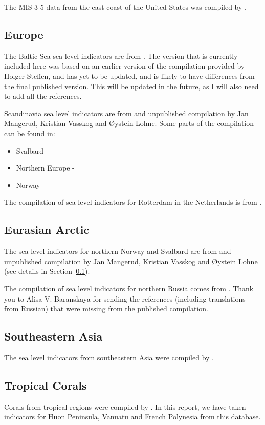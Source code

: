 The MIS 3-5 data from the east coast of the United States was compiled by \citet{PicoEtal2017}.

\subsection{Europe}

\label{sec:Europe}

The Baltic Sea sea level indicators are from \citep{RosentauEtal2021}. The version that is currently included here was based on an earlier version of the compilation provided by Holger Steffen, and has yet to be updated, and is likely to have differences from the final published version. This will be updated in the future, as I will also need to add all the references.


Scandinavia sea level indicators are from and unpublished compilation by Jan Mangerud, Kristian Vasskog and \O{}ystein Lohne. Some parts of the compilation can be found in:

\begin{itemize}
  \item Svalbard - \citet{BondevikEtal1995}
  \item Northern Europe - \citet{FormanEtal2004}
  \item Norway - \citet{LohneEtal2007,RomundsetEtal2010,RomundsetEtal2011,RomundsetEtal2015,RomundsetEtal2018,VasskogEtal2019}
\end{itemize}

The compilation of sea level indicators for Rotterdam in the Netherlands is from \citet{HijmaCohen2019}.


\subsection{Eurasian Arctic}

The sea level indicators for northern Norway and Svalbard are from and unpublished compilation by Jan Mangerud, Kristian Vasskog and \O{}ystein Lohne (see details in Section~\ref{sec:Europe}).

The compilation of sea level indicators for northern Russia comes from \citet{BaranskayaEtal2018}. Thank you to Alisa V. Baranskaya for sending the references (including translations from Russian) that were missing from the published compilation.

\subsection{Southeastern Asia}

The sea level indicators from southeastern Asia were compiled by \citet{MannEtal2019}.

\subsection{Tropical Corals}

Corals from tropical regions were compiled by \citet{HibbertEtal2016}. In this report, we have taken indicators for Huon Peninsula, Vanuatu and French Polynesia from this database.

